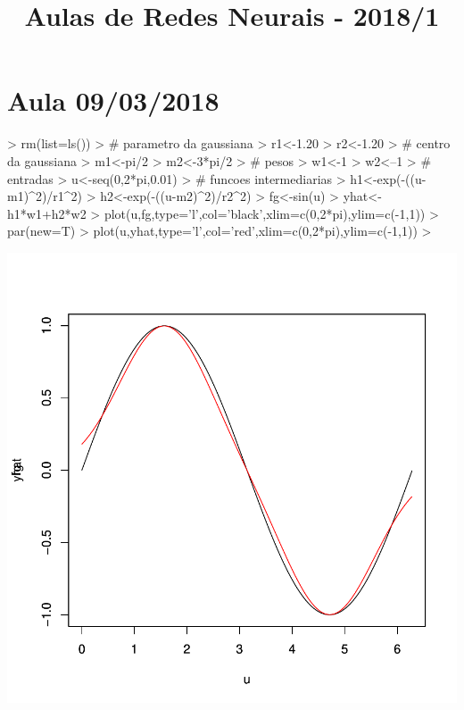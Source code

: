 \documentclass{article}
\title{Aulas de Redes Neurais - 2018/1}
\begin{document}


\maketitle

\section{Aula 09/03/2018}

\begin{Schunk}
\begin{Sinput}
> rm(list=ls())
> # parametro da gaussiana
> r1<-1.20
> r2<-1.20
> # centro da gaussiana
> m1<-pi/2
> m2<-3*pi/2
> # pesos
> w1<-1
> w2<--1
> # entradas
> u<-seq(0,2*pi,0.01)
> # funcoes intermediarias
> h1<-exp(-((u-m1)^2)/r1^2)
> h2<-exp(-((u-m2)^2)/r2^2)
> fg<-sin(u)
> yhat<-h1*w1+h2*w2
> plot(u,fg,type='l',col='black',xlim=c(0,2*pi),ylim=c(-1,1))
> par(new=T)
> plot(u,yhat,type='l',col='red',xlim=c(0,2*pi),ylim=c(-1,1))
> 
\end{Sinput}
\end{Schunk}
\includegraphics{02-001}
\end{document}
